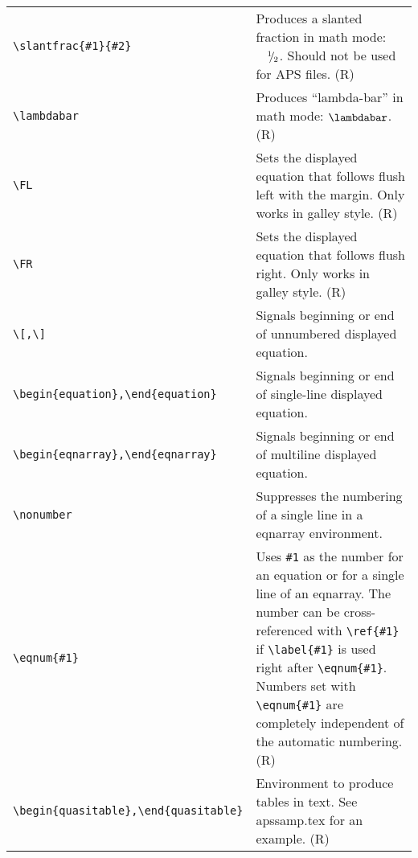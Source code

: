 \begin{quasitable}
\begin{tabular}{lp{4.5in}}
\verb+\slantfrac{#1}{#2}+ & Produces a slanted fraction in math mode:
        $\kern1em^{1}\kern-.3em/\kern-.1em_{2}$. Should not be used for APS files. (R) \\[4pt]

\verb+\lambdabar+ & Produces ``lambda-bar'' in math mode: $\lambdabar$. (R)
                       \\[4pt]

\verb+\FL+  &
                     Sets the displayed equation that follows flush left
                        with the margin. Only works in galley style. (R)
                          \\[4pt]

\verb+\FR+  &
                     Sets the displayed equation that follows flush right.
                        Only works in galley style. (R)
                          \\[4pt]

\verb+\[,\]+  &
                   Signals beginning or end of unnumbered displayed
                        equation.
                          \\[4pt]

\verb+\begin{equation},\end{equation}+  &
       Signals beginning or end of single-line displayed equation.
                          \\[4pt]

\verb+\begin{eqnarray},\end{eqnarray}+  &
       Signals beginning or end of multiline displayed equation.
                          \\[4pt]

\verb+\nonumber+  &
               Suppresses the numbering of a single line in a
                        eqnarray environment.
                          \\[4pt]

\verb+\eqnum{#1}+ & Uses \verb+#1+ as the number for an equation or for
  a single line of an eqnarray. The number can be cross-referenced with
  \verb+\ref{#1}+ if \verb+\label{#1}+ is used right after \verb+\eqnum{#1}+.
  Numbers set with \verb+\eqnum{#1}+ are completely independent of the
  automatic numbering. (R) \\[4pt]

\verb+\begin{quasitable},\end{quasitable}+  &
     Environment to produce tables in text. See apssamp.tex for an example.
                       (R)   \\[4pt]


\end{tabular}
\end{quasitable}
